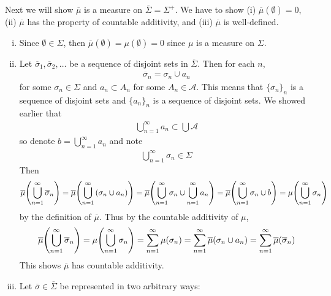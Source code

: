 \documentclass[12pt]{article}
\theoremstyle{plain}
\begin{document}
Next we will show $\overline{\mu}$ is a measure on $\overline{\Sigma} = \Sigma^+$.  We have to show (i) $\overline{\mu}(\emptyset) = 0$, (ii) $\overline{\mu}$ has the property of countable additivity, and (iii) $\overline{\mu}$ is well-defined.
\begin{enumerate}[(i)]
    \item
        Since $\emptyset \in \Sigma$, then $\overline{\mu}(\emptyset) = \mu(\emptyset) = 0$ since $\mu$ is a measure on $\Sigma$.
    \item
        Let $\overline{\sigma}_1, \overline{\sigma}_2, \dots$ be a sequence of disjoint sets in $\overline{\Sigma}$.  Then for each $n$,
        \begin{align*}
            \overline{\sigma}_n = \sigma_n \cup a_n
        \end{align*}
        for some $\sigma_n \in \Sigma$ and $a_n \subset A_n$ for some $A_n \in \mathcal{A}$.  This means that $\{\sigma_n\}_n$ is a sequence of disjoint sets and $\{a_n\}_n$ is a sequence of disjoint sets.  We showed earlier that
        \begin{align*}
            \bigcup_{n=1}^\infty a_n \subset \bigcup \mathcal{A}
        \end{align*}
        so denote $b = \bigcup_{n=1}^\infty a_n$ and note
        \begin{align*}
            \bigcup_{n=1}^\infty \sigma_n \in \Sigma
        \end{align*}
        Then
        \begin{align*}
            \overline{\mu}\qty(\bigcup_{n=1}^\infty \overline{\sigma}_n) = \overline{\mu}\qty(\bigcup_{n=1}^\infty \qty(\sigma_n \cup a_n)) = \overline{\mu}\qty(\bigcup_{n=1}^\infty \sigma_n \cup \bigcup_{n=1}^\infty a_n) = \overline{\mu}\qty(\bigcup_{n=1}^\infty \sigma_n \cup b) = \mu\qty(\bigcup_{n=1}^\infty \sigma_n)
        \end{align*}
        by the definition of $\overline{\mu}$.  Thus by the countable additivity of $\mu$,
        \begin{align*}
            \overline{\mu}\qty(\bigcup_{n=1}^\infty \overline{\sigma}_n) = \mu\qty(\bigcup_{n=1}^\infty \sigma_n) = \sum_{n=1}^\infty \mu\qty(\sigma_n) = \sum_{n=1}^\infty \overline{\mu}\qty(\sigma_n \cup a_n) = \sum_{n=1}^\infty \overline{\mu}(\overline{\sigma}_n)
        \end{align*}
        This shows $\overline{\mu}$ has countable additivity.
    \item
        Let $\overline{\sigma} \in \overline{\Sigma}$ be represented in two arbitrary ways:

\end{enumerate}
\end{document}
